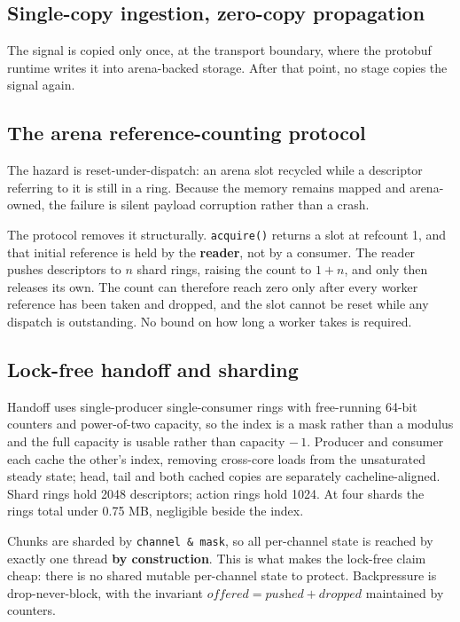\documentclass[runningheads]{llncs}
\begin{document}
\subsection{Single-copy ingestion, zero-copy propagation}

The signal is copied only once, at the transport boundary, where the protobuf runtime writes it
into arena-backed storage. After that point, no stage copies the signal again.

\subsection{The arena reference-counting protocol}

The hazard is reset-under-dispatch: an arena slot recycled while a descriptor referring to it
is still in a ring. Because the memory remains mapped and arena-owned, the failure is silent
payload corruption rather than a crash.

The protocol removes it structurally. \texttt{acquire()} returns a
slot at refcount 1, and that initial reference is held by the \textbf{reader}, not by a
consumer. The reader pushes descriptors to $n$ shard rings, raising the count to $1 + n$, and
only then releases its own. The count can therefore reach zero only after every worker
reference has been taken and dropped, and the slot cannot be reset while any dispatch is
outstanding. No bound on how long a worker takes is required.

\subsection{Lock-free handoff and sharding}

Handoff uses single-producer single-consumer rings with free-running 64-bit counters and
power-of-two capacity, so the index is a mask rather than a modulus and the full capacity is
usable rather than capacity $-\,1$. Producer and consumer each cache the other's index,
removing cross-core loads from the unsaturated steady state; head, tail and both cached copies
are separately cacheline-aligned. Shard rings hold 2048 descriptors; action rings hold 1024. At
four shards the rings total under 0.75 MB, negligible beside the index.

Chunks are sharded by \texttt{channel \& mask}, so all per-channel state is reached by exactly
one thread \textbf{by construction}. This is what makes the lock-free claim cheap: there is no
shared mutable per-channel state to protect. Backpressure is drop-never-block, with the
invariant $\textit{offered} = \textit{pushed} + \textit{dropped}$ maintained by counters.
\end{document}
